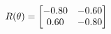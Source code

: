 \documentclass[preview]{standalone}
\begin{document}
\begin{align*}
\special{dvisvgm:raw <g id='unique000'>}R(\theta) = \begin{bmatrix}-0.80 & -0.60\\0.60 & -0.80\end{bmatrix}\special{dvisvgm:raw </g>}
\end{align*}
\end{document}
